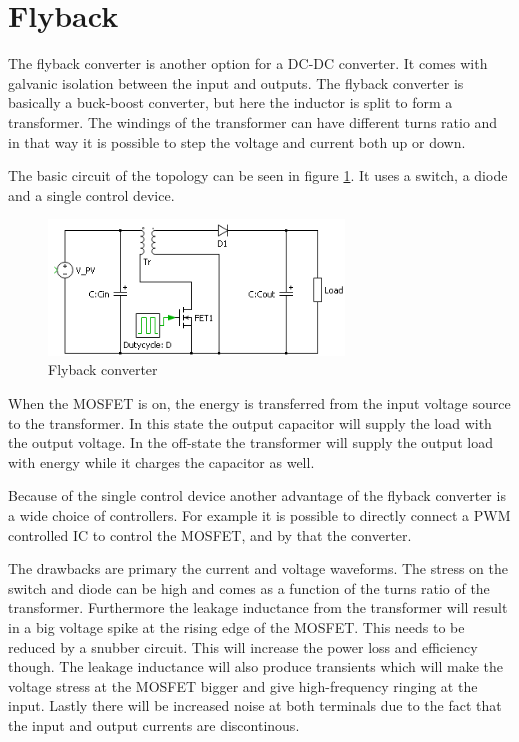 \section{Flyback}

The flyback converter is another option for a DC-DC converter. It comes with galvanic isolation between the input and outputs. The flyback converter is basically a buck-boost converter, but here the inductor is split to form a transformer. The windings of the transformer can have different turns ratio and in that way it is possible to step the voltage and current both up or down. 

The basic circuit of the topology can be seen in figure \ref{Flyback_SCHEMATIC}. It uses a switch, a diode and a single control device.    

\begin{figure}[htbp]
	\begin{center}
	\includegraphics[width=0.7\textwidth]{../Pictures/flyback_schem.png}
	\caption{Flyback converter}
	\label{Flyback_SCHEMATIC}
	\end{center}
\end{figure}

When the MOSFET is on, the energy is transferred from the input voltage source to the transformer. In this state the output capacitor will supply the load with the output voltage. In the off-state the transformer will supply the output load with energy while it charges the capacitor as well. \cite{flyback}

Because of the single control device another advantage of the flyback converter is a wide choice of controllers. For example it is possible to directly connect a PWM controlled IC to control the MOSFET, and by that the converter. 

The drawbacks are primary the current and voltage waveforms. The stress on the switch and diode can be high and comes as a function of the turns ratio of the transformer. Furthermore the leakage inductance from the transformer will result in a big voltage spike at the rising edge of the MOSFET. This needs to be reduced by a snubber circuit. This will increase the power loss and efficiency though. The leakage inductance will also produce transients which will make the voltage stress at the MOSFET bigger and give high-frequency ringing at the input. Lastly there will be increased noise at both terminals due to the fact that the input and output currents are discontinous.\cite{underthehood}
